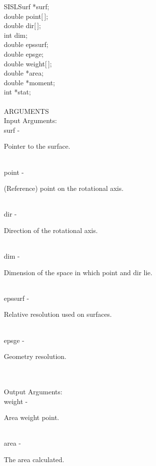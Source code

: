 		\>\>	SISLSurf	\> 	*{\fov surf};\\
		\>\>	double	\>	{\fov point}[\,];\\
		\>\>	double	\>	{\fov dir}[\,];\\
		\>\>	int	\>	{\fov dim};\\
		\>\>	double	\>	{\fov epssurf};\\
		\>\>	double	\>	{\fov epsge};\\
		\>\>	double	\>	{\fov weight}[\,];\\
		\>\>	double 	\>	*{\fov area};\\
		\>\>	double 	\>	*{\fov moment};\\
		\>\>	int 	\>	*{\fov stat};\\
\\
ARGUMENTS\\
	\>Input Arguments:\\
	\>\>	{\fov surf}\> - \>	\begin{minipg2}
				Pointer to the surface.
				\end{minipg2}\\
	\>\>	{\fov point}\> - \>	\begin{minipg2}
				(Reference) point on the rotational axis.
				\end{minipg2}\\
	\>\>	{\fov dir}\> - \>	\begin{minipg2}
				Direction of the rotational axis.	
				\end{minipg2}\\
	\>\>	{\fov dim}\> - \>	\begin{minipg2}
				Dimension of the space in which point and dir lie.
				\end{minipg2} \\
	\>\>	{\fov epssurf}\> - \> 	\begin{minipg2}
				Relative resolution used on surfaces.
				\end{minipg2}\\
	\>\>	{\fov epsge}\> - \>	\begin{minipg2}
				Geometry resolution.
				\end{minipg2}\\
\\
	\>Output Arguments:\\
	\>\>	{\fov weight}\> - \>	\begin{minipg2}
				Area weight point.
				\end{minipg2}\\
	\>\>	{\fov area}\> - \>	\begin{minipg2}
				The area calculated.
				\end{minipg2}\\
